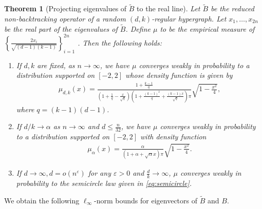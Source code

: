 \documentclass[11pt,reqno]{amsart}
\newtheorem{theorem}{Theorem}[section]
\theoremstyle{definition}
\begin{document}
\begin{theorem} [Projecting eigenvalues of $\tilde B$ to the real line]\label{thm:bi_real}  Let $\tilde B$ be the reduced non-backtracking operator of a random  $(d,k)$-regular hypergraph. Let $x_1,\dots,x_{2n}$ be the real part of the eigenvalues of $\tilde B$. Define $\mu$ to be the empirical measure of  $\left\{ \frac{{2}x_i}{\sqrt{(d-1)(k-1)}}\right\}_{i=1}^{2n}$ . Then the following holds:
\begin{enumerate}
    \item If $d,k$ are fixed, as $n\to\infty$, {we have} $\mu$ converges weakly in probability to a distribution supported on $[-2,2]$ whose density function is given by
   \begin{align}
	\mu_{d,k}(x)=\frac{1+\frac{k-1}{q}}{(1+\frac{1}{q}-\frac{x}{\sqrt{q}})(1+\frac{(k-1)^2}{q}+\frac{(k-1)x}{\sqrt{q}})\pi}\sqrt{1-\frac{x^2}{4}},
	\end{align}
	where $q=(k-1)(d-1)$.
    \item If $d/k\to \alpha$ as $n\to\infty$ and $d\leq \frac{n}{32}$, {we have} $\mu$ converges weakly in probability to a distribution supported on $[-2,2]$ with density function 
    \begin{align}
        \mu_{\alpha}(x)=\frac{\alpha}{(1+\alpha+\sqrt{\alpha}x)\pi}\sqrt{1-\frac{x^2}{4}}.
    \end{align}
    \item If $d\to\infty, d=o(n^{\varepsilon})$ for any $\varepsilon>0$ and $\frac{d}{k}\to\infty$, $\mu$ converges weakly in probability to the semicircle law given in \eqref{eq:semicircle}.
\end{enumerate}
\end{theorem}



We obtain the following $\ell_{\infty}$-norm bounds for eigenvectors of $\tilde B$ and $B$. 
\end{document}
